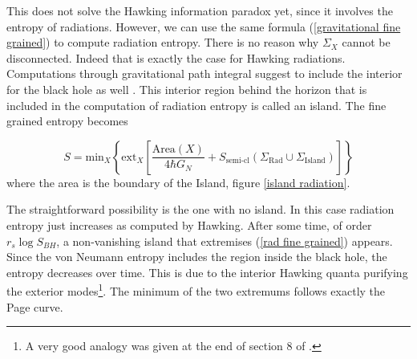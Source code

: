 This does not solve the Hawking information paradox yet, since it involves the entropy of radiations. However, we can use the same formula (\ref{gravitational fine grained}) to compute radiation entropy. There is no reason why $\Sigma_X$ cannot be disconnected. Indeed that is exactly the case for Hawking radiations. Computations through gravitational path integral suggest to include the interior for the black hole as well \cite{Marolf_2021}. This interior region behind the horizon that is included in the computation of radiation entropy is called an island. The fine grained entropy becomes

\begin{equation}\label{rad fine grained}
    S = \text{min}_X\left\{\text{ext}_X\left[\frac{\text{Area}\left(X\right)}{4\hbar G_N} + S_\text{semi-cl}\left(\Sigma_\text{Rad}\cup\Sigma_\text{Island}\right)\right]\right\}
\end{equation}
where the area is the boundary of the Island, figure \ref{island radiation}.

The straightforward possibility is the one with no island. In this case radiation entropy just increases as computed by Hawking. After some time, of order $r_s\log S_{BH}$, a non-vanishing island that extremises (\ref{rad fine grained}) appears. Since the von Neumann entropy includes the region inside the black hole, the entropy decreases over time. This is due to the interior Hawking quanta purifying the exterior modes\footnote{A very good analogy was given at the end of section 8 of \cite{almheiri2020entropy}.}. The minimum of the two extremums follows exactly the Page curve.
